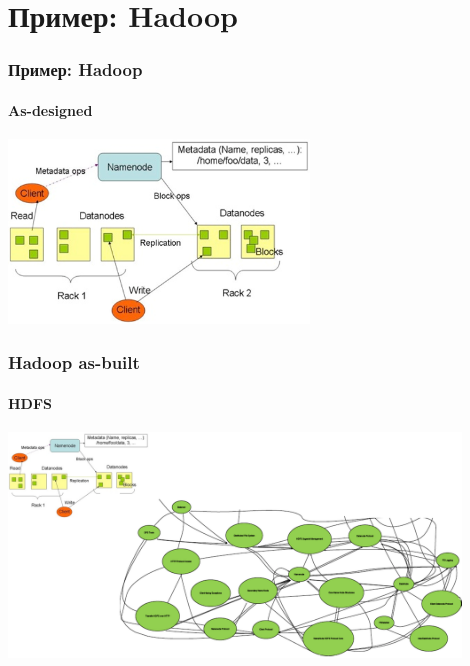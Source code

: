 \documentclass{../slides-style}
\begin{document}
    \section{Пример: Hadoop}

    \begin{frame}
        \frametitle{Пример: Hadoop}
        \framesubtitle{As-designed}
        \begin{center}
            \includegraphics[width=0.6\textwidth]{hadoopPrescriptive.png}
        \end{center}
    \end{frame}

    \begin{frame}
        \frametitle{Hadoop as-built}
        \framesubtitle{HDFS}
        \begin{center}
            \includegraphics[width=0.9\textwidth]{hadoopDescriptive.png}
        \end{center}
    \end{frame}
\end{document}
